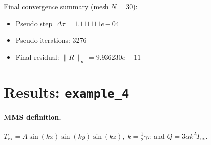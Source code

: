 \documentclass[11pt,a4paper]{article}
\begin{document}
\noindent Final convergence summary (mesh $N=30$):
\begin{itemize}
\item Pseudo step: $\Delta\tau=1.111111e-04$
\item Pseudo iterations: 3276
\item Final residual: $\|R\|_\infty=9.936230e-11$
\end{itemize}
\section{Results: \texttt{example\_4}}
\paragraph{MMS definition.}
$T_{\mathrm{ex}} = A\sin(kx)\sin(ky)\sin(kz),\; k=\tfrac{1}{2}\gamma\pi$ and $Q = 3\alpha k^2 T_{\mathrm{ex}}$.
\end{document}
